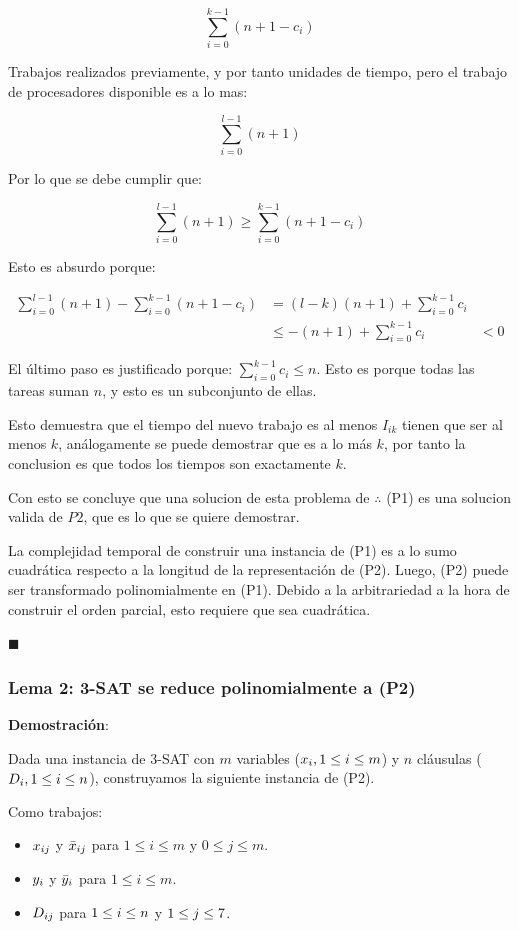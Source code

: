 \documentclass[14pt]{extarticle}
\begin{document}
$$\sum_{i = 0}^{k-1} (n+1 - c_i)$$

Trabajos realizados previamente, y por tanto unidades de tiempo, pero el trabajo de procesadores disponible es a lo mas:

$$\sum_{i= 0}^{l -1} (n+1)$$

Por lo que se debe cumplir que:


$$\sum_{i= 0}^{l -1} (n+1) \geq \sum_{i = 0}^{k-1} (n+1 - c_i)$$

Esto es absurdo porque:

\begin{align*}
    \sum_{i= 0}^{l -1} (n+1) - \sum_{i = 0}^{k-1} (n+1 - c_i) &= (l-k)(n+1) + \sum_{i = 0}^{k-1} c_i \\
    &\leq -(n+1) + \sum_{i = 0}^{k-1} c_i
    &< 0
\end{align*}

El último paso es justificado porque: $\sum_{i = 0}^{k-1} c_i \leq n$. Esto es porque todas las tareas suman $n$, y esto es un subconjunto de ellas. 

Esto demuestra que el tiempo del nuevo trabajo es al menos $I_{ik}$ tienen que ser al menos $k$, análogamente se puede demostrar que es a lo más $k$, por tanto la conclusion es que todos los tiempos son exactamente $k$.

Con esto se concluye que una solucion de esta problema de $\therefore$ (P1) es una solucion valida de $P2$, que es lo que se quiere demostrar.

La complejidad temporal de construir una instancia de (P1) es a lo sumo cuadrática respecto a la longitud de la representación de (P2). Luego, (P2) puede ser transformado polinomialmente en (P1). Debido a la arbitrariedad a la hora de construir el orden parcial, esto requiere que sea cuadrática.

$\blacksquare$

\subsubsection*{Lema 2: 3-SAT se reduce polinomialmente a (P2)}

\textbf{Demostración}:

Dada una instancia de 3-SAT con $m$ variables ($x_i, \space 1 \leq i \leq m$) y $n$ cláusulas ($D_i, \space 1 \leq i \leq n$), construyamos la siguiente instancia de (P2).

Como trabajos:

\begin{itemize}
    \item $x_{ij} \space$ y $\space \bar x_{ij}$ para $1 \leq i \leq m$ y $0 \leq j \leq m$.
    \item $y_{i} \space$ y $\space \bar y_{i}$ para $1 \leq i \leq m$.
    \item $D_{ij} \space$ para $\space 1 \leq i \leq n \space$ y $\space 1 \leq j \leq 7$.
\end{itemize}
\end{document}
